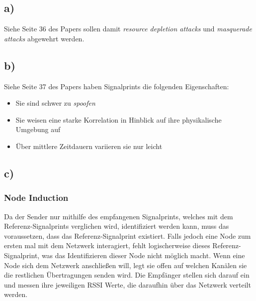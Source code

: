 \documentclass[12pt,a4paper]{article}
\begin{document}
\subsection*{a)} 
Siehe Seite 36 des Papers sollen damit \textit{resource 
depletion attacks} und \textit{masquerade attacks} 
abgewehrt werden.


\subsection*{b)} 
Siehe Seite 37 des Papers haben Signalprints die folgenden 
Eigenschaften:

\begin{itemize}
	\item Sie sind schwer zu \textit{spoofen} 
	\item Sie weisen eine starke Korrelation in Hinblick auf ihre 
	physikalische Umgebung auf
	\item Über mittlere Zeitdauern variieren sie nur leicht 
\end{itemize}


\subsection*{c)} 

\subsubsection*{Node Induction}
Da der Sender nur mithilfe des empfangenen Signalprints,
welches mit dem Referenz-Signalprints verglichen wird, 
identifiziert werden kann, muss das voraussetzen, dass 
das Referenz-Signalprint existiert. Falls jedoch eine 
Node zum ersten mal mit dem Netzwerk interagiert, fehlt 
logischerweise dieses Referenz-Signalprint, was das 
Identifizieren dieser Node nicht möglich macht. 
Wenn eine Node sich dem Netzwerk anschließen will, legt 
sie offen auf welchen Kanälen sie die restlichen 
Übertragungen senden wird. Die Empfänger stellen sich 
darauf ein und messen ihre jeweiligen RSSI Werte, die 
daraufhin über das Netzwerk verteilt werden. 
\end{document}
